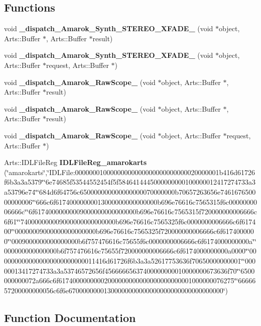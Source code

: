 \subsection*{Functions}
\begin{CompactItemize}
\item 
void {\bf \_\-dispatch\_\-Amarok\_\-Synth\_\-STEREO\_\-XFADE\_} (void $\ast$object, Arts::Buffer $\ast$, Arts::Buffer $\ast$result)
\item 
void {\bf \_\-dispatch\_\-Amarok\_\-Synth\_\-STEREO\_\-XFADE\_} (void $\ast$object, Arts::Buffer $\ast$request, Arts::Buffer $\ast$)
\item 
void {\bf \_\-dispatch\_\-Amarok\_\-Raw\-Scope\_} (void $\ast$object, Arts::Buffer $\ast$, Arts::Buffer $\ast$result)
\item 
void {\bf \_\-dispatch\_\-Amarok\_\-Raw\-Scope\_} (void $\ast$object, Arts::Buffer $\ast$, Arts::Buffer $\ast$result)
\item 
void {\bf \_\-dispatch\_\-Amarok\_\-Raw\-Scope\_} (void $\ast$object, Arts::Buffer $\ast$request, Arts::Buffer $\ast$)
\item 
Arts::IDLFile\-Reg {\bf IDLFile\-Reg\_\-amarokarts} (\char`\"{}amarokarts\char`\"{},\char`\"{}IDLFile:00000001000000000000000000000000020000001b416d61726f6b3a3a5379\char`\"{}\char`\"{}6e74685f53544552454f5f5846414445000000000100000012417274733a3a53796e74\char`\"{}\char`\"{}684d6f64756c650000000000000000070000000b70657263656e746167650000000006\char`\"{}\char`\"{}666c6f61740000000013000000000000000b696e76616c7565315f6c0000000006666c\char`\"{}\char`\"{}6f61740000000009000000000000000b696e76616c7565315f720000000006666c6f61\char`\"{}\char`\"{}740000000009000000000000000b696e76616c7565325f6c0000000006666c6f617400\char`\"{}\char`\"{}00000009000000000000000b696e76616c7565325f720000000006666c6f6174000000\char`\"{}\char`\"{}0009000000000000000b6f757476616c75655f6c0000000006666c6f6174000000000a\char`\"{}\char`\"{}000000000000000b6f757476616c75655f720000000006666c6f6174000000000a0000\char`\"{}\char`\"{}0000000000000000000000000011416d61726f6b3a3a52617753636f70650000000001\char`\"{}\char`\"{}00000013417274733a3a53746572656f45666665637400000000010000000673636f70\char`\"{}\char`\"{}6500000000072a666c6f61740000000002000000000000000000000001000000076275\char`\"{}\char`\"{}6666657200000000056c6f6e67000000001300000000000000000000000000000000\char`\"{})
\end{CompactItemize}


\subsection{Function Documentation}

